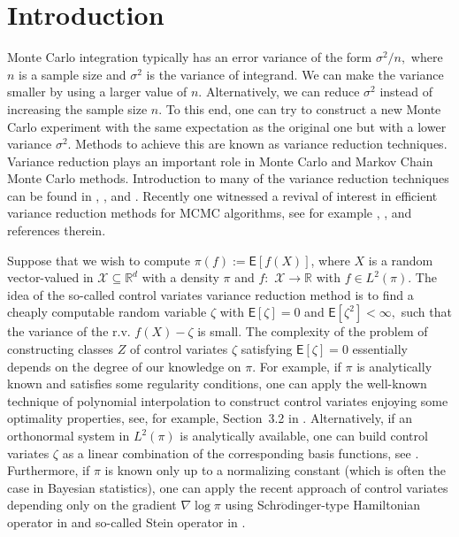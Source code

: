 \documentclass[bj]{imsart}
\begin{document}
\section{Introduction}

Monte Carlo integration typically has an error variance of the form
$\sigma^{2}/n,$ where $n$ is a sample size and \(\sigma^2\) is the variance of  integrand. We can make the variance smaller
by using a larger value of $n$.  Alternatively,
 we can  reduce $\sigma^2$ instead of increasing the sample size \(n\). To this end, one can try to construct
a new Monte Carlo experiment with the same expectation as the original one
but with a lower variance $\sigma^2$. Methods to achieve this are known as variance
reduction techniques. Variance reduction plays an important role in
Monte Carlo and Markov Chain Monte Carlo methods. Introduction to many of the variance reduction techniques can be found in \cite{christian1999monte}, \cite{rubinstein2016simulation}, \cite{GobetBook} and \cite{glasserman2013monte}. Recently one witnessed a revival of interest in efficient variance reduction methods  for MCMC algorithms, see for example \cite{dellaportas2012control}, \cite{mira2013zero}, \cite{brosse2018diffusion} and references therein.
\par
Suppose that we wish to compute $\pi(f):=\mathsf{E}\left[f(X)\right]$, where $X$
is a random vector-valued in $\mathcal{X}\subseteq\mathbb{R}^{d}$ with a density $\pi$ and $f:$
$\mathcal{X}\to\mathbb{R}$ with $f\in L^2(\pi)$.
The idea of the so-called control variates variance reduction method
 is to find a cheaply computable random variable $\zeta$ with $\mathsf{E}[\zeta]=0$ and \(\mathsf{E}[\zeta^2]<\infty,\)
such that the variance of the r.v. $f(X)-\zeta$ is small.  The complexity of the problem of constructing classes $Z$ of control variates \(\zeta\) satisfying   $\mathsf{E}[\zeta]=0$ essentially depends on the degree of our knowledge on \(\pi.\)
For example, if \(\pi\) is analytically known and satisfies some regularity conditions, one can apply the well-known technique of  polynomial interpolation to construct control variates enjoying  some optimality properties, see, for example, Section~3.2 in \cite{dimov2008monte}. Alternatively, if an orthonormal system in \(L^2(\pi)\) is analytically available, one can build control variates \(\zeta\) as a linear combination of the corresponding basis functions, see \cite{GobetCV}. Furthermore, if \(\pi\) is known only up to a normalizing constant (which is often the case in Bayesian statistics), one can apply the recent approach of control variates  depending only on the gradient \(\nabla \log \pi\)  using Schr\(\ddot{\text{o}}\)dinger-type Hamiltonian operator in  \cite{mira2013zero} and so-called Stein operator in \cite{brosse2018diffusion}.
\end{document}
